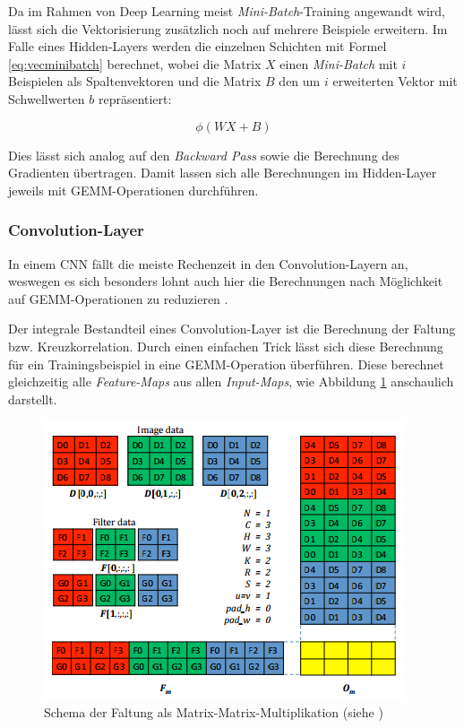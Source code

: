 Da im Rahmen von Deep Learning meist \textit{Mini-Batch}-Training angewandt wird, lässt sich die Vektorisierung zusätzlich noch auf mehrere Beispiele erweitern.
Im Falle eines Hidden-Layers werden die einzelnen Schichten mit Formel \ref{eq:vecminibatch} berechnet, wobei die Matrix $X$ einen \textit{Mini-Batch} mit $i$ Beispielen als Spaltenvektoren und die Matrix $B$ den um $i$ erweiterten Vektor mit Schwellwerten $b$ repräsentiert:

\begin{equation}
\label{eq:vecminibatch} 
\phi(WX + B)
\end{equation}

Dies lässt sich analog auf den \textit{Backward Pass} sowie die Berechnung des Gradienten übertragen. Damit lassen sich alle Berechnungen im Hidden-Layer jeweils mit GEMM-Operationen durchführen.

\subsubsection{Convolution-Layer}
In einem CNN fällt die meiste Rechenzeit in den Convolution-Layern an, weswegen es sich besonders lohnt auch hier die Berechnungen nach Möglichkeit auf GEMM-Operationen zu reduzieren \cite[vgl. im Folgenden][]{Caffee2015}. 

Der integrale Bestandteil eines Convolution-Layer ist die Berechnung der Faltung bzw. Kreuzkorrelation. Durch einen einfachen Trick lässt sich diese Berechnung für ein Trainingsbeispiel in eine GEMM-Operation überführen. Diese berechnet gleichzeitig alle \textit{Feature-Maps} aus allen \textit{Input-Maps}, wie Abbildung \ref{fig:5_convolution} anschaulich darstellt.

\begin{figure}
\centering
\includegraphics[width=0.6\linewidth]{images/5_convolution}
\caption[]{Schema der Faltung als Matrix-Matrix-Multiplikation (siehe \cite{Chetlur14})}
\label{fig:5_convolution}
\end{figure}

